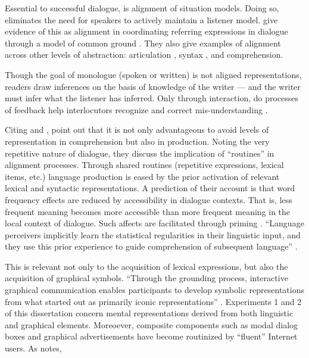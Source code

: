 Essential to successful dialogue, is alignment of situation models. Doing so, eliminates the need for speakers to actively maintain a listener model. \citet{Pickering:2003uy} give evidence of this as alignment in coordinating referring expressions in dialogue through a model of common ground \citep{Brennan:1996ud,Clark:2003uw,WilkesGibbs:1992ui}. They also give examples of alignment across other levels of abstraction: articulation \citep{Bard:2000bp}, syntax \citep{Branigan:2007ug}, and comprehension. 

Though the goal of monologue (spoken or written) is not aligned representations, readers draw inferences on the basis of knowledge of the writer --- and the writer must infer what the listener has inferred. Only through interaction, do processes of feedback help interlocutors recognize and correct mis-understanding  \citep{Clark:1996tm}.  

Citing  \citet{Levelt:1993tk} and \citet{Dell:1986vk}, \citet{Pickering:2003uy}  point out that it is not only advantageous to avoid levels of representation in comprehension but also in production. Noting the very repetitive nature of dialogue, they discuss the implication of ``routines'' in alignment processes. Through shared routines (repetitive expressions, lexical items, etc.) language production is eased by the prior activation of relevant lexical and syntactic representations. A prediction of their account is that word frequency effects are reduced by accessibility in dialogue contexts. That is, less frequent meaning becomes more accessible than more frequent meaning in the local context of dialogue. Such affects are facilitated through priming  \citep{Bargh:2006bo}.  ``Language perceivers implicitly learn the statistical regularities in their linguistic input, and they use this prior experience to guide comprehension of subsequent language''  \citep{MacDonald:2013bx}. 

This is relevant not only to the acquisition of lexical expressions, but also the acquisition of graphical symbols. ``Through the grounding process, interactive graphical communication enables participants to develop symbolic representations from what started out as primarily iconic representations''  \citep[p. 4]{Garrod:2007wk}.  Experiments 1 and 2 of this dissertation concern mental representations derived from both linguistic and graphical elements. Moreoever, composite components such as modal dialog boxes and graphical advertisements have become routinized by ``fluent'' Internet users. As  \citep{Bargh:2006bo}  notes,

